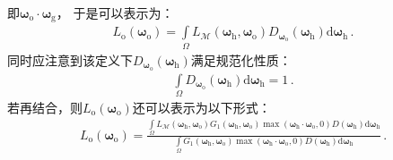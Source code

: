 即${\bm\omega}_{\mathrm{o}}\cdot{\bm\omega}_{\mathrm{g}}$，
于是可以表示为：
\begin{align}\label{eq:08ex01-RadianceMacroOut}
    L_{\mathrm{o}}({\bm\omega}_{\mathrm{o}})
    =\int\limits_{\varOmega}L_{\mathcal{M}}({\bm\omega}_{\mathrm{h}},{\bm\omega}_{\mathrm{o}})
    D_{{\bm\omega}_{\mathrm{o}}}({\bm\omega}_{\mathrm{h}})\mathrm{d}{\bm\omega}_{\mathrm{h}}\, .
\end{align}
同时应注意到该定义下$D_{{\bm\omega}_{\mathrm{o}}}({\bm\omega}_{\mathrm{h}})$满足规范化性质：
\begin{align}\label{eq:08ex01-VisibleDistributionNormalization}
    \int\limits_{\varOmega}D_{{\bm\omega}_{\mathrm{o}}}({\bm\omega}_{\mathrm{h}})
    \mathrm{d}{\bm\omega}_{\mathrm{h}}=1\, .
\end{align}
若再结合，则$L_{\mathrm{o}}({\bm\omega}_{\mathrm{o}})$还可以表示为以下形式：
\begin{align}\label{eq:08ex01-RadianceMacroOutV2}
    L_{\mathrm{o}}({\bm\omega}_{\mathrm{o}})
    =\frac{\displaystyle\int\limits_{\varOmega}L_{\mathcal{M}}({\bm\omega}_{\mathrm{h}},{\bm\omega}_{\mathrm{o}})
    G_1({\bm\omega}_{\mathrm{h}},{\bm\omega}_{\mathrm{o}})
    \max({\bm\omega}_{\mathrm{h}}\cdot{\bm\omega}_{\mathrm{o}},0)
    D({\bm\omega}_{\mathrm{h}})\mathrm{d}{\bm\omega}_{\mathrm{h}}}
    {\displaystyle\int\limits_{\varOmega}G_1({\bm\omega}_{\mathrm{h}},{\bm\omega}_{\mathrm{o}})
    \max({\bm\omega}_{\mathrm{h}}\cdot{\bm\omega}_{\mathrm{o}},0)
    D({\bm\omega}_{\mathrm{h}})\mathrm{d}{\bm\omega}_{\mathrm{h}}}\, .
\end{align}


